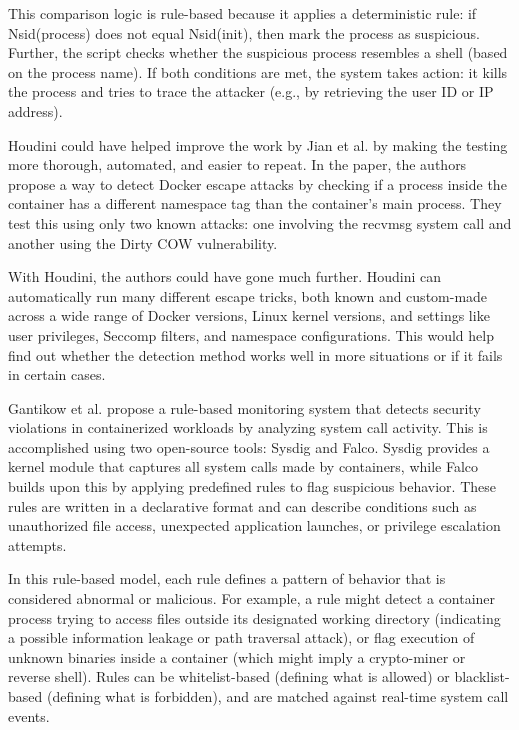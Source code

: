 \documentclass[12pt]{report}
\begin{document}
\begin{doublespace}
This comparison logic is rule-based because it applies a deterministic rule: if Nsid(process) does not equal Nsid(init), then mark the process as suspicious. Further, the script checks whether the suspicious process resembles a shell (based on the process name). If both conditions are met, the system takes action: it kills the process and tries to trace the attacker (e.g., by retrieving the user ID or IP address).

Houdini could have helped improve the work by Jian et al. \cite{jian2017defense} by making the testing more thorough, automated, and easier to repeat. In the paper, the authors propose a way to detect Docker escape attacks by checking if a process inside the container has a different namespace tag than the container’s main process. They test this using only two known attacks: one involving the recvmsg system call and another using the Dirty COW vulnerability.

With Houdini, the authors could have gone much further. Houdini can automatically run many different escape tricks, both known and custom-made across a wide range of Docker versions, Linux kernel versions, and settings like user privileges, Seccomp filters, and namespace configurations. This would help find out whether the detection method works well in more situations or if it fails in certain cases.

Gantikow et al. \cite{gantikow2019rule} propose a rule-based monitoring system that detects security violations in containerized workloads by analyzing system call activity. This is accomplished using two open-source tools: Sysdig and Falco. Sysdig provides a kernel module that captures all system calls made by containers, while Falco builds upon this by applying predefined rules to flag suspicious behavior. These rules are written in a declarative format and can describe conditions such as unauthorized file access, unexpected application launches, or privilege escalation attempts.

In this rule-based model, each rule defines a pattern of behavior that is considered abnormal or malicious. For example, a rule might detect a container process trying to access files outside its designated working directory (indicating a possible information leakage or path traversal attack), or flag execution of unknown binaries inside a container (which might imply a crypto-miner or reverse shell). Rules can be whitelist-based (defining what is allowed) or blacklist-based (defining what is forbidden), and are matched against real-time system call events.


\end{doublespace}
\end{document}
